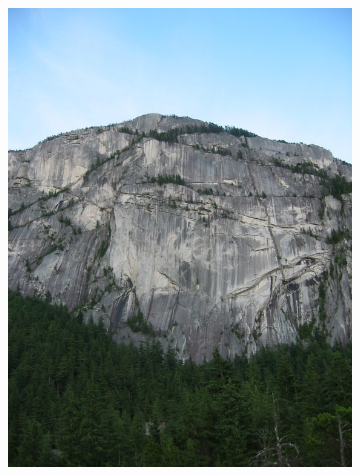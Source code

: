 \documentclass[12pt]{article}
\begin{document}
\begin{figure}[t!]
\begin{subfigure}[t]{0.3\textwidth}
        \includegraphics[width=\linewidth]{../Images/Set2/2}
    \end{subfigure}
        \begin{subfigure}[t]{0.3\textwidth}
        \centering

\end{subfigure}
\end{figure}
\end{document}
